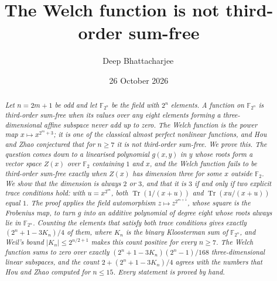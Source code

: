 \documentclass[11pt,a4paper,reqno]{amsart}
\title[The Welch function is not third-order sum-free]{The Welch function is not third-order sum-free}
\author{Deep Bhattacharjee\,\orcidlink{0000-0003-0466-750X}}
\date{26 October 2026}
\theoremstyle{remark}
\numberwithin{equation}{section}
\newcommand{\F}{\mathbb{F}}
\newcommand{\Tr}{\operatorname{Tr}}
\begin{document}
\begin{abstract}
\itshape
Let $n=2m+1$ be odd and let $\F_{2^n}$ be the field with $2^n$ elements. A function on $\F_{2^n}$ is third-order sum-free when its values over any eight elements forming a three-dimensional affine subspace never add up to zero. The Welch function is the power map $x\mapsto x^{2^m+3}$; it is one of the classical almost perfect nonlinear functions, and Hou and Zhao conjectured that for $n\ge7$ it is not third-order sum-free. We prove this. The question comes down to a linearised polynomial $g(x,y)$ in $y$ whose roots form a vector space $Z(x)$ over $\F_2$ containing $1$ and $x$, and the Welch function fails to be third-order sum-free exactly when $Z(x)$ has dimension three for some $x$ outside $\F_2$. We show that the dimension is always $2$ or $3$, and that it is $3$ if and only if two explicit trace conditions hold: with $u=x^{2^m}$, both $\Tr(1/(x+u))$ and $\Tr(xu/(x+u))$ equal $1$. The proof applies the field automorphism $z\mapsto z^{2^{m+1}}$, whose square is the Frobenius map, to turn $g$ into an additive polynomial of degree eight whose roots always lie in $\F_{2^n}$. Counting the elements that satisfy both trace conditions gives exactly $(2^n+1-3K_n)/4$ of them, where $K_n$ is the binary Kloosterman sum of $\F_{2^n}$, and Weil's bound $|K_n|\le 2^{n/2+1}$ makes this count positive for every $n\ge7$. The Welch function sums to zero over exactly $(2^n+1-3K_n)(2^n-1)/168$ three-dimensional linear subspaces, and the count $2+(2^n+1-3K_n)/4$ agrees with the numbers that Hou and Zhao computed for $n\le15$. Every statement is proved by hand.
\end{abstract}

\maketitle
\end{document}
